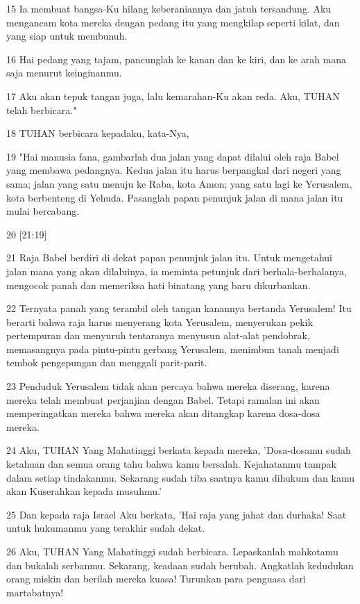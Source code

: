 \par 15 Ia membuat bangsa-Ku hilang keberaniannya dan jatuh tersandung. Aku mengancam kota mereka dengan pedang itu yang mengkilap seperti kilat, dan yang siap untuk membunuh.
\par 16 Hai pedang yang tajam, pancunglah ke kanan dan ke kiri, dan ke arah mana saja menurut keinginanmu.
\par 17 Aku akan tepuk tangan juga, lalu kemarahan-Ku akan reda. Aku, TUHAN telah berbicara."
\par 18 TUHAN berbicara kepadaku, kata-Nya,
\par 19 "Hai manusia fana, gambarlah dua jalan yang dapat dilalui oleh raja Babel yang membawa pedangnya. Kedua jalan itu harus berpangkal dari negeri yang sama; jalan yang satu menuju ke Raba, kota Amon; yang satu lagi ke Yerusalem, kota berbenteng di Yehuda. Pasanglah papan penunjuk jalan di mana jalan itu mulai bercabang.
\par 20 [21:19]
\par 21 Raja Babel berdiri di dekat papan penunjuk jalan itu. Untuk mengetahui jalan mana yang akan dilaluinya, ia meminta petunjuk dari berhala-berhalanya, mengocok panah dan memeriksa hati binatang yang baru dikurbankan.
\par 22 Ternyata panah yang terambil oleh tangan kanannya bertanda Yerusalem! Itu berarti bahwa raja harus menyerang kota Yerusalem, menyerukan pekik pertempuran dan menyuruh tentaranya menyusun alat-alat pendobrak, memasangnya pada pintu-pintu gerbang Yerusalem, menimbun tanah menjadi tembok pengepungan dan menggali parit-parit.
\par 23 Penduduk Yerusalem tidak akan percaya bahwa mereka diserang, karena mereka telah membuat perjanjian dengan Babel. Tetapi ramalan ini akan memperingatkan mereka bahwa mereka akan ditangkap karena dosa-dosa mereka.
\par 24 Aku, TUHAN Yang Mahatinggi berkata kepada mereka, 'Dosa-dosamu sudah ketahuan dan semua orang tahu bahwa kamu bersalah. Kejahatanmu tampak dalam setiap tindakanmu. Sekarang sudah tiba saatnya kamu dihukum dan kamu akan Kuserahkan kepada musuhmu.'
\par 25 Dan kepada raja Israel Aku berkata, 'Hai raja yang jahat dan durhaka! Saat untuk hukumanmu yang terakhir sudah dekat.
\par 26 Aku, TUHAN Yang Mahatinggi sudah berbicara. Lepaskanlah mahkotamu dan bukalah serbanmu. Sekarang, keadaan sudah berubah. Angkatlah kedudukan orang miskin dan berilah mereka kuasa! Turunkan para penguasa dari martabatnya!
